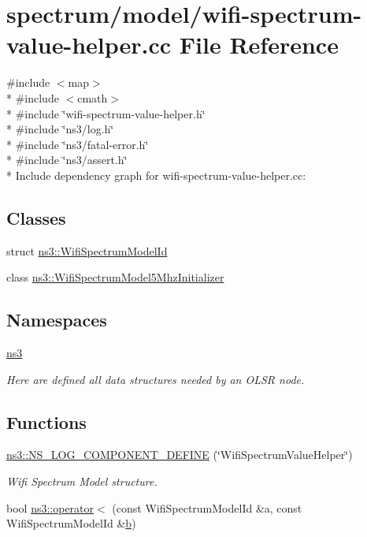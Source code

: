 \hypertarget{wifi-spectrum-value-helper_8cc}{}\section{spectrum/model/wifi-\/spectrum-\/value-\/helper.cc File Reference}
\label{wifi-spectrum-value-helper_8cc}
{\ttfamily \#include $<$map$>$}\\*
{\ttfamily \#include $<$cmath$>$}\\*
{\ttfamily \#include \char`\"{}wifi-\/spectrum-\/value-\/helper.\+h\char`\"{}}\\*
{\ttfamily \#include \char`\"{}ns3/log.\+h\char`\"{}}\\*
{\ttfamily \#include \char`\"{}ns3/fatal-\/error.\+h\char`\"{}}\\*
{\ttfamily \#include \char`\"{}ns3/assert.\+h\char`\"{}}\\*
Include dependency graph for wifi-\/spectrum-\/value-\/helper.cc\+:
\subsection*{Classes}
\begin{DoxyCompactItemize}
\item 
struct \hyperlink{structns3_1_1WifiSpectrumModelId}{ns3\+::\+Wifi\+Spectrum\+Model\+Id}
\item 
class \hyperlink{classns3_1_1WifiSpectrumModel5MhzInitializer}{ns3\+::\+Wifi\+Spectrum\+Model5\+Mhz\+Initializer}
\end{DoxyCompactItemize}
\subsection*{Namespaces}
\begin{DoxyCompactItemize}
\item 
 \hyperlink{namespacens3}{ns3}
\begin{DoxyCompactList}\small\item\em Here are defined all data structures needed by an O\+L\+SR node. \end{DoxyCompactList}\end{DoxyCompactItemize}
\subsection*{Functions}
\begin{DoxyCompactItemize}
\item 
\hyperlink{namespacens3_ac03056e4ff4e2f114d2859e2e2968484}{ns3\+::\+N\+S\+\_\+\+L\+O\+G\+\_\+\+C\+O\+M\+P\+O\+N\+E\+N\+T\+\_\+\+D\+E\+F\+I\+NE} (\char`\"{}Wifi\+Spectrum\+Value\+Helper\char`\"{})
\begin{DoxyCompactList}\small\item\em Wifi Spectrum Model structure. \end{DoxyCompactList}\item 
bool \hyperlink{namespacens3_af573941f9909bbe5abae3bc200a39bf6}{ns3\+::operator$<$} (const Wifi\+Spectrum\+Model\+Id \&a, const Wifi\+Spectrum\+Model\+Id \&\hyperlink{lte__pathloss_8m_a21ad0bd836b90d08f4cf640b4c298e7c}{b})
\end{DoxyCompactItemize}
